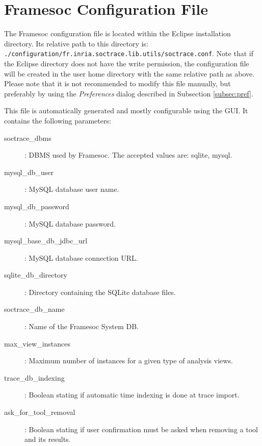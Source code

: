 \documentclass[twoside]{article}
\begin{document}
\begin{sloppypar}
\appendix

\section{Framesoc Configuration File}
\label{app:conf}

The Framesoc configuration file is located within the Eclipse installation directory.
Its relative path to this directory is:  \texttt{./configuration/fr.inria.soctrace.lib.utils/soctrace.conf}. Note that if the Eclipse directory does not have the write permission, the configuration file will be created in the user home directory with the same relative path as above. Please note that it is not recommended to modify this file manually, but preferably by using the \textit{Preferences} dialog described in Subsection \ref{subsec:pref}. 

This file is automatically generated and mostly configurable using the GUI. 
It contains the following parameters:
\begin{description}
 \item[soctrace\_dbms]: DBMS used by Framesoc. The accepted values are: sqlite, mysql.
 \item[mysql\_db\_user]: MySQL database user name.
 \item[mysql\_db\_password]: MySQL database password.
 \item[mysql\_base\_db\_jdbc\_url]: MySQL database connection URL.
 \item[sqlite\_db\_directory]: Directory containing the SQLite database files.
 \item[soctrace\_db\_name]: Name of the Framesoc System DB.
 \item[max\_view\_instances]: Maximum number of instances for a given type of analysis views.
 \item[trace\_db\_indexing]: Boolean stating if automatic time indexing is done at trace import.
 \item[ask\_for\_tool\_removal]: Boolean stating if user confirmation must be asked when removing a tool and its results.
\end{description}

\newpage
\renewcommand{\refname}{References}
{}


\end{sloppypar} 
\end{document}
